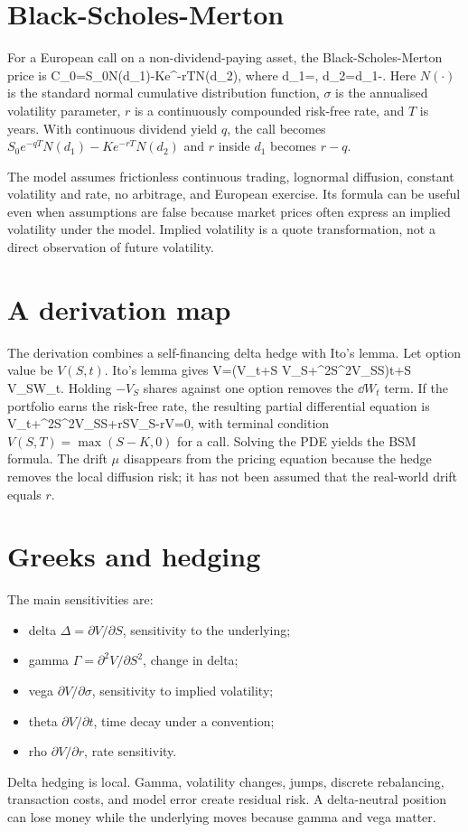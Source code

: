 \section{Black-Scholes-Merton}
For a European call on a non-dividend-paying asset, the Black-Scholes-Merton price is
  C_0=S_0N(d_1)-Ke^{-rT}N(d_2),
\closeformula
where
  d_1=,
  \qquad d_2=d_1-\sigma{}.
\closeformula
Here $N(\cdot)$ is the standard normal cumulative distribution function, $\sigma$ is the annualised volatility parameter, $r$ is a continuously compounded risk-free rate, and $T$ is years. With continuous dividend yield $q$, the call becomes $S_0e^{-qT}N(d_1)-Ke^{-rT}N(d_2)$ and $r$ inside $d_1$ becomes $r-q$.

The model assumes frictionless continuous trading, lognormal diffusion, constant volatility and rate, no arbitrage, and European exercise. Its formula can be useful even when assumptions are false because market prices often express an implied volatility under the model. Implied volatility is a quote transformation, not a direct observation of future volatility.

\section{A derivation map}
The derivation combines a self-financing delta hedge with Ito's lemma. Let option value be $V(S,t)$. Ito's lemma gives
  \dd V=\left(V_t+\mu S V_S+\sigma^2S^2V_{SS}\right)\dd t+\sigma S V_S\dd W_t.
\closeformula
Holding $-V_S$ shares against one option removes the $\dd W_t$ term. If the portfolio earns the risk-free rate, the resulting partial differential equation is
  V_t+\sigma^2S^2V_{SS}+rSV_S-rV=0,
\closeformula
with terminal condition $V(S,T)=\max(S-K,0)$ for a call. Solving the PDE yields the BSM formula. The drift $\mu$ disappears from the pricing equation because the hedge removes the local diffusion risk; it has not been assumed that the real-world drift equals $r$.

\section{Greeks and hedging}
The main sensitivities are:
\begin{itemize}
  \item delta $\Delta=\partial V/\partial S$, sensitivity to the underlying;
  \item gamma $\Gamma=\partial^2V/\partial S^2$, change in delta;
  \item vega $\partial V/\partial\sigma$, sensitivity to implied volatility;
  \item theta $\partial V/\partial t$, time decay under a convention;
  \item rho $\partial V/\partial r$, rate sensitivity.
\end{itemize}
Delta hedging is local. Gamma, volatility changes, jumps, discrete rebalancing, transaction costs, and model error create residual risk. A delta-neutral position can lose money while the underlying moves because gamma and vega matter.

